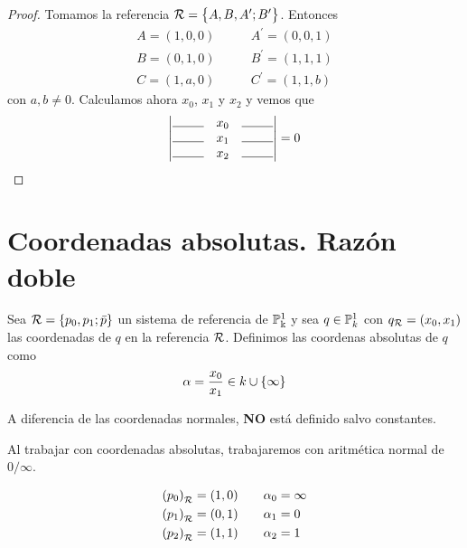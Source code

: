 \begin{proof}
Tomamos la referencia $\mathcal{R} = \left\{A,B,A^\prime;B^\prime\right\}$. Entonces
\[
\begin{aligned}
A = (1,0,0) &\qquad A^\prime = (0,0,1) \\
B = (0,1,0) &\qquad B^\prime = (1,1,1) \\
C = (1,a,0) &\qquad C^\prime = (1,1,b)
\end{aligned}
\]
con $a,b \neq 0$. Calculamos ahora $x_0$, $x_1$ y $x_
2$ y vemos que
\[
  \determinant{\line(1,0){25} & x_0 & \line(1,0){25} \\
    \line(1,0){25} & x_1 & \line(1,0){25} \\ \line(1,0){25} & x_2 & \line(1,0){25}} = 0
\]
\end{proof}


\section{Coordenadas absolutas. Razón doble}

\begin{defi}
  Sea $\mathcal{R} = \left\{p_0,p_1;\bar{p}\right\}$ un sistema de referencia de $\mathbb{P}^1_\Bbbk$ y
  sea $q \in \mathbb{P}^1_k$ con $q_{\mathcal{R}} = (x_0,x_1)$ las coordenadas de $q$ en la
  referencia $\mathcal{R}$. Definimos las coordenas absolutas de $q$ como
  \[
    \alpha = \frac{x_0}{x_1} \in k \cup \left\{\infty\right\}
  \]
\end{defi}

\begin{obs}
  A diferencia de las coordenadas normales, \textbf{NO} está definido salvo constantes.
\end{obs}
\begin{obs}
  Al trabajar con coordenadas absolutas, trabajaremos con aritmética normal de $0/\infty$.
\end{obs}
\begin{obs}
  \[
    \begin{aligned}
      \left( p_0 \right)_{\mathcal{R}} = (1,0) &\qquad \alpha_0 = \infty \\
      \left( p_1 \right)_{\mathcal{R}} = (0,1) &\qquad \alpha_1 = 0 \\
      \left( p_2 \right)_{\mathcal{R}} = (1,1) &\qquad \alpha_2 = 1 \\
    \end{aligned}
  \]
\end{obs}

